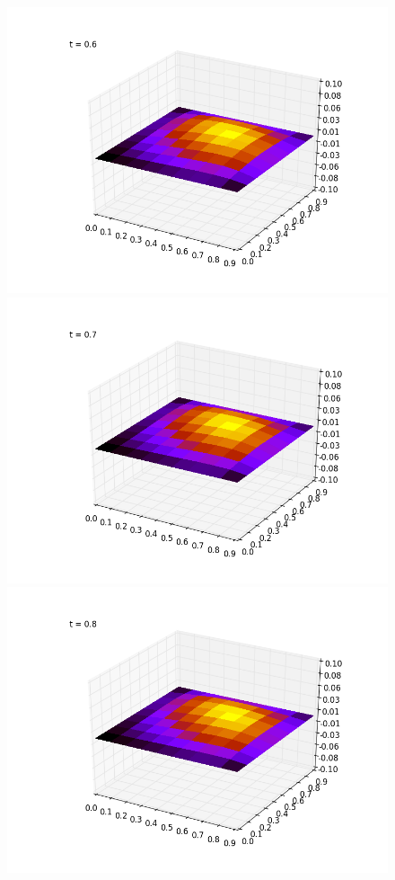 \documentclass[paper=a4, fontsize=13pt]{scrartcl} %
\numberwithin{equation}{section} %
\numberwithin{figure}{section} %
\numberwithin{table}{section} %
\begin{document}
\begin{figure}[!htb]
  \includegraphics[width=\linewidth]{6}
\endminipage\hfill
{}
  \includegraphics[width=\linewidth]{7}
\endminipage\hfill
{}%
  \includegraphics[width=\linewidth]{8}
\endminipage
\end{figure}
\end{document}
